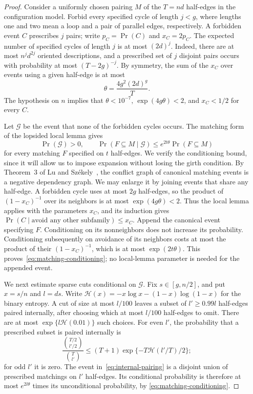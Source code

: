 \documentclass[11pt,reqno]{amsart}
\theoremstyle{remark}
\numberwithin{equation}{section}
\begin{document}
\begin{proof}
Consider a uniformly chosen pairing $M$ of the $T=nd$ half-edges in
the configuration model.  Forbid every specified cycle of length
$j<g$, where lengths one and two mean a loop and a pair of parallel
edges, respectively.  A forbidden event $C$ prescribes $j$ pairs;
write $p_C=\Pr(C)$ and $x_C=2p_C$.  The expected number of specified
cycles of length $j$ is at most $(2d)^j$.  Indeed, there are at most
$n^j d^{2j}$ oriented descriptions, and a prescribed set of $j$
disjoint pairs occurs with probability at most $(T-2g)^{-j}$.
By symmetry, the sum of the $x_C$ over events using a given
half-edge is at most
\begin{equation}\label{eq:cycle-weight}
 \theta=\frac{4g^2(2d)^g}{T}.
\end{equation}
The hypothesis on $n$ implies that $\theta<10^{-7}$,
$\exp(4g\theta)<2$, and $x_C<1/2$ for every $C$.

Let $\mathcal G$ be the event that none of the forbidden cycles
occurs.  The matching form of the lopsided local lemma gives
\begin{equation}\label{eq:matching-conditioning}
 \Pr(\mathcal G)>0,
 \qquad
 \Pr(F\subseteq M\mid\mathcal G)
 \le e^{2t\theta}\Pr(F\subseteq M)
\end{equation}
for every matching $F$ specified on $t$ half-edges.  We verify the
conditioning bound, since it will allow us to impose expansion
without losing the girth condition.  By Theorem~3 of Lu and
Sz\'ekely~\cite{LS}, the conflict graph of canonical matching events
is a negative dependency graph.  We may enlarge it by joining events
that share any half-edge.  A forbidden cycle uses at most $2g$
half-edges, so the product of $(1-x_C)^{-1}$ over its neighbors is at
most $\exp(4g\theta)<2$.  Thus the local lemma applies with the
parameters $x_C$, and its induction gives
$\Pr(C\mid\text{avoid any other subfamily})\le x_C$.
Append the canonical event specifying $F$.  Conditioning on its
nonneighbors does not increase its probability.  Conditioning
subsequently on avoidance of its neighbors costs at most the product
of their $(1-x_C)^{-1}$, which is at most $\exp(2t\theta)$.
This proves~\eqref{eq:matching-conditioning}; no local-lemma parameter
is needed for the appended event.

We next estimate sparse cuts conditional on $\mathcal G$.  Fix
$s\in[g,n/2]$, and put $x=s/n$ and $l=ds$.  Write
$\mathcal H(x)=-x\log x-(1-x)\log(1-x)$ for the binary entropy.
A cut of size at most $l/100$ leaves a subset of $l'\ge0.99l$
half-edges paired internally, after choosing which at most $l/100$
half-edges to omit.  There are at most
$\exp\{l\mathcal H(0.01)\}$ such choices.  For even $l'$, the
probability that a prescribed subset is paired internally is
\begin{equation}\label{eq:internal-pairing}
 \frac{\binom{T/2}{l'/2}}{\binom{T}{l'}}
 \le (T+1)\exp\{-T\mathcal H(l'/T)/2\};
\end{equation}
for odd $l'$ it is zero.  The event in~\eqref{eq:internal-pairing}
is a disjoint union of prescribed matchings on $l'$ half-edges.
Its conditional probability is therefore at most $e^{2l\theta}$
times its unconditional probability, by
\eqref{eq:matching-conditioning}.


\end{proof}
\end{document}
